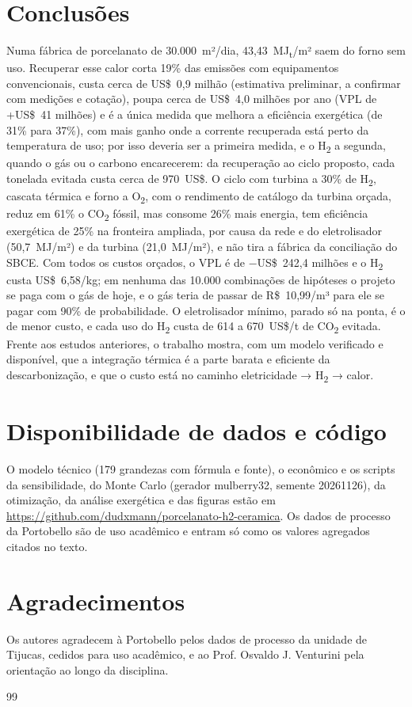 \documentclass[10pt,a4paper,twocolumn]{article}
\newcommand{\MJt}{MJ\textsubscript{t}}
\newcommand{\Ht}{H\textsubscript{2}}
\newcommand{\Ot}{O\textsubscript{2}}
\newcommand{\COt}{CO\textsubscript{2}}
\begin{document}
\section{Conclusões}

Numa fábrica de porcelanato de 30.000~m²/dia, 43,43~\MJt/m² saem do forno sem uso. Recuperar esse calor corta 19\% das emissões com equipamentos convencionais, custa cerca de US\$~0,9 milhão (estimativa preliminar, a confirmar com medições e cotação), poupa cerca de US\$~4,0 milhões por ano (VPL de +US\$~41 milhões) e é a única medida que melhora a eficiência exergética (de 31\% para 37\%), com mais ganho onde a corrente recuperada está perto da temperatura de uso; por isso deveria ser a primeira medida, e o \Ht{} a segunda, quando o gás ou o carbono encarecerem: da recuperação ao ciclo proposto, cada tonelada evitada custa cerca de 970~US\$. O ciclo com turbina a 30\% de \Ht, cascata térmica e forno a \Ot, com o rendimento de catálogo da turbina orçada, reduz em 61\% o \COt{} fóssil, mas consome 26\% mais energia, tem eficiência exergética de 25\% na fronteira ampliada, por causa da rede e do eletrolisador (50,7~MJ/m²) e da turbina (21,0~MJ/m²), e não tira a fábrica da conciliação do SBCE. Com todos os custos orçados, o VPL é de −US\$~242,4 milhões e o \Ht{} custa US\$~6,58/kg; em nenhuma das 10.000 combinações de hipóteses o projeto se paga com o gás de hoje, e o gás teria de passar de R\$~10,99/m³ para ele se pagar com 90\% de probabilidade. O eletrolisador mínimo, parado só na ponta, é o de menor custo, e cada uso do \Ht{} custa de 614 a 670~US\$/t de \COt{} evitada. Frente aos estudos anteriores, o trabalho mostra, com um modelo verificado e disponível, que a integração térmica é a parte barata e eficiente da descarbonização, e que o custo está no caminho eletricidade → \Ht{} → calor.

\section*{Disponibilidade de dados e código}

O modelo técnico (179 grandezas com fórmula e fonte), o econômico e os scripts da sensibilidade, do Monte Carlo (gerador mulberry32, semente 20261126), da otimização, da análise exergética e das figuras estão em \url{https://github.com/dudxmann/porcelanato-h2-ceramica}. Os dados de processo da Portobello são de uso acadêmico e entram só como os valores agregados citados no texto.

\section*{Agradecimentos}

Os autores agradecem à Portobello pelos dados de processo da unidade de Tijucas, cedidos para uso acadêmico, e ao Prof. Osvaldo J. Venturini pela orientação ao longo da disciplina.

\renewcommand{\refname}{Referências}
\begin{thebibliography}{99}
\setlength{\itemsep}{0pt}\footnotesize

\end{thebibliography}
\end{document}
